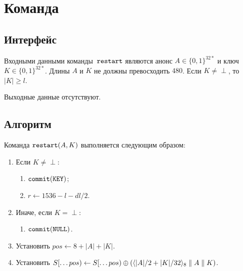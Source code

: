 \section{Команда }\label{PRG.Restart}

\subsection{Интерфейс}\label{PRG.Restart.IFace}

Входными данными команды~$\texttt{restart}$ являются анонс $A\in\{0,1\}^{32*}$ 
и ключ $K\in\{0,1\}^{32*}$. Длины $A$ и $K$ не должны превосходить $480$.
Если $K\neq\perp$, то~$|K|\geq l$.

Выходные данные отсутствуют.

\subsection{Алгоритм}\label{PRG.Restart.Alg}

Команда $\texttt{restart}(A,K)$ выполняется следующим образом:
\begin{enumerate}
\item
Если $K\neq\perp$:
\begin{enumerate}
\item
$\texttt{commit}(\texttt{KEY})$;
\item
$r\leftarrow 1536-l-dl/2$.
\end{enumerate}
\item
Иначе, если $K=\perp$:
\begin{enumerate}
\item
$\texttt{commit}(\texttt{NULL})$.
\end{enumerate}
\item
Установить
$pos\leftarrow 8+|A|+|K|$.
\item
Установить
$S[\dots pos)\leftarrow S[\dots pos)\oplus
\left(\langle|A|/2+|K|/32\rangle_8\parallel A\parallel K\right)$.
\end{enumerate}

